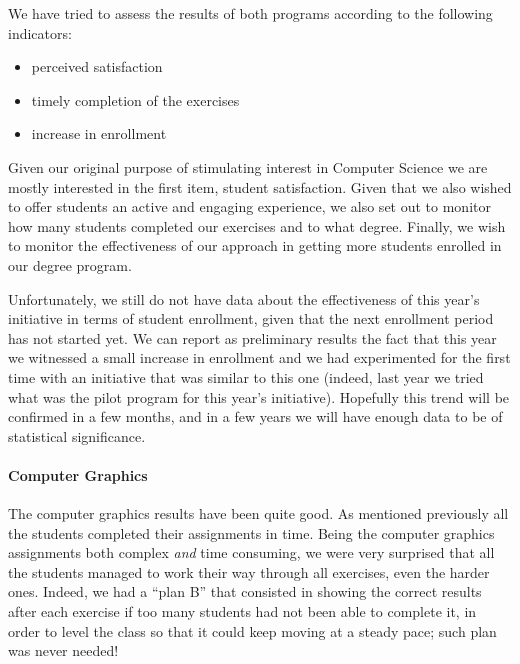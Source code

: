 
We have tried to assess the results of both programs according to the following indicators:

\begin{itemize}
\item perceived satisfaction
\item timely completion of the exercises
\item increase in enrollment
\end{itemize}

Given our original purpose of stimulating interest in Computer Science we are mostly interested in the first item, student satisfaction. Given that we also wished to offer students an active and engaging experience, we also set out to monitor how many students completed our exercises and to what degree. Finally, we wish to monitor the effectiveness of our approach in getting more students enrolled in our degree program.

Unfortunately, we still do not have data about the effectiveness of this year's initiative in terms of student enrollment, given that the next enrollment period has not started yet. We can report as preliminary results the fact that this year we witnessed a small increase in enrollment and we had experimented for the first time with an initiative that was similar to this one (indeed, last year we tried what was the pilot program for this year's initiative). Hopefully this trend will be confirmed in a few months, and in a few years we will have enough data to be of statistical significance.

\paragraph{Computer Graphics}

The computer graphics results have been quite good. As mentioned previously all the students completed their assignments in time. Being the computer graphics assignments both complex \textit{and} time consuming, we were very surprised that all the students managed to work their way through all exercises, even the harder ones. Indeed, we had a ``plan B'' that consisted in showing the correct results after each exercise if too many students had not been able to complete it, in order to level the class so that it could keep moving at a steady pace; such plan was never needed!

